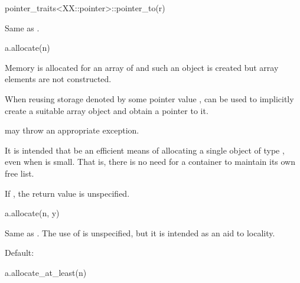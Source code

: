 \begin{itemdecl}
pointer_traits<XX::pointer>::pointer_to(r)
\end{itemdecl}

\begin{itemdescr}
\pnum
\result
{}

\pnum
\ensures
Same as .
\end{itemdescr}

\begin{itemdecl}
a.allocate(n)
\end{itemdecl}

\begin{itemdescr}
\pnum
\result
{}

\pnum
\effects
Memory is allocated for an array of  
and such an object is created
but array elements are not constructed.
\begin{example}
When reusing storage denoted by some pointer value ,
can be used to implicitly create a suitable array object
and obtain a pointer to it.
\end{example}

\pnum
\throws
{} may throw an appropriate exception.

\pnum
\begin{note}
It is intended that  be an efficient means
of allocating a single object of type , even when 
is small. That is, there is no need for a container to maintain its own
free list.
\end{note}

\pnum
\remarks
If , the return value is unspecified.
\end{itemdescr}

\begin{itemdecl}
a.allocate(n, y)
\end{itemdecl}

\begin{itemdescr}
\pnum
\result
{}

\pnum
\effects
Same as .
The use of  is unspecified, but it is intended as an aid to locality.

\pnum
\remarks
Default: 
\end{itemdescr}

\begin{itemdecl}
a.allocate_at_least(n)
\end{itemdecl}

